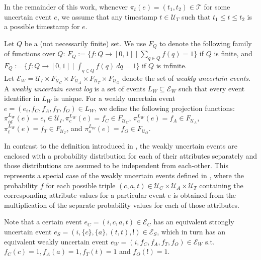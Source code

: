 In the remainder of this work, whenever $\pi_t(e) = (t_1,t_2) \in \mathcal{T}$ for some uncertain event $e$, we assume that any timestamp $t \in \mathcal{U}_T$ such that $t_1 \leq t \leq t_2$ is a possible timestamp for $e$.
\pagebreak

\begin{definition} 
Let $Q$ be a (not necessarily finite) set.
We use $F_Q$ to denote the following family of functions over $Q$:
$F_Q := \{f: Q \rightarrow [0,1] \mid
\sum_{q \in Q} f(q) = 1\}$ if $Q$ is finite, and 
$F_Q := \{f: Q \rightarrow [0,1] \mid
\int_{q \in Q} f(q) ~ dq = 1\}$ if $Q$ is infinite. \\
Let $\mathcal{E}_W = \mathcal{U}_I \times F_{\mathcal{U}_C} \times F_{\mathcal{U}_A} \times F_{\mathcal{U}_T} \times F_{\mathcal{U}_O}$
denote the set of \emph{weakly uncertain events}.
A \emph{weakly uncertain event log} is a set of events $L_W \subseteq \mathcal{E}_W$ such that every event identifier in $L_W$ is unique.
For a weakly uncertain event $e=(e_i,f_C,f_A,f_T,f_O) \in L_W$, we define the following projection functions:
$\pi_{id}^{L_W}(e)=e_i \in \mathcal{U}_I, 
\pi_c^{L_W}(e)=f_C \in F_{\mathcal{U}_C}$, 
$\pi_a^{L_W}(e)=f_A \in F_{\mathcal{U}_A}$, 
$\pi_t^{L_W}(e)=f_T \in F_{\mathcal{U}_T}$, and 
$\pi^{L_W}_o(e)=f_O \in F_{\mathcal{U}_O}$. 
\end{definition}

In contrast to the definition introduced in \cite{mining}, the weakly uncertain events are enclosed with a probability distribution for each of their attributes separately and those distributions are assumed to be independent from each-other.
This represents a special case of the weakly uncertain events defined in \cite{mining}, where the probability $f$ for each possible triple $(c,a,t) \in \mathcal{U}_C \times \mathcal{U}_A \times \mathcal{U}_T$ containing the corresponding attribute values for a particular event $e$ is obtained from the multiplication of the separate probability values for each of those attributes.

Note that a certain event $e_C=(i,c,a,t) \in \mathcal{E}_C$ has an equivalent strongly uncertain event $e_S=(i,\{c\},\{a\},(t,t),!) \in \mathcal{E}_S$, which in turn has an equivalent weakly uncertain event 
$e_W=(i,f_C,f_A,f_T,f_O) \in \mathcal{E}_W$ s.t. $f_C(c)=1, f_A(a)=1, f_T(t)=1$ and $f_O(!)=1$.

